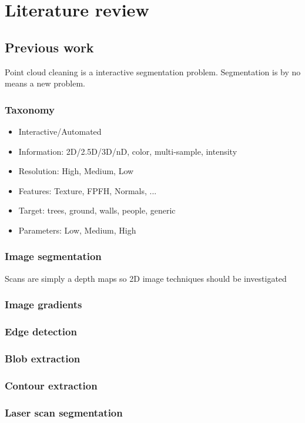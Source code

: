 \chapter{Literature review} \label{ch:lit}

\section{Previous work}
Point cloud cleaning is a interactive segmentation problem. Segmentation is by no means a new problem.

\subsection{Taxonomy}
\begin{itemize}
	\item Interactive/Automated
	\item Information: 2D/2.5D/3D/nD, color, multi-sample, intensity
	\item Resolution: High, Medium, Low
	\item Features: Texture, FPFH, Normals, ...
	\item Target: trees, ground, walls, people, generic
	\item Parameters: Low, Medium, High
\end{itemize}


\subsection{Image segmentation}
	Scans are simply a depth maps so 2D image techniques should be investigated
	\subsection{Image gradients}
	\subsection{Edge detection}
	\subsection{Blob extraction}
	\subsection{Contour extraction}

\subsection{Laser scan segmentation}
